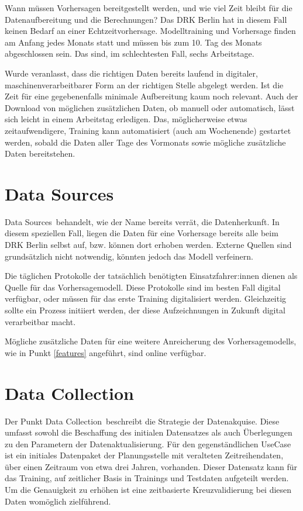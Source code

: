 Wann müssen Vorhersagen bereitgestellt werden, und wie viel Zeit bleibt für die Datenaufbereitung und die Berechnungen? Das DRK Berlin hat in diesem Fall keinen Bedarf an einer Echtzeitvorhersage. Modelltraining und Vorhersage finden am Anfang jedes Monats statt und müssen bis zum 10. Tag des Monats abgeschlossen sein. Das sind, im schlechtesten Fall, sechs Arbeitstage.

Wurde veranlasst, dass die richtigen Daten bereits laufend in digitaler, maschinenverarbeitbarer Form an der richtigen Stelle abgelegt werden. Ist die Zeit für eine gegebenenfalls minimale Aufbereitung kaum noch relevant. Auch der Download von möglichen zusätzlichen Daten, ob manuell oder automatisch, lässt sich leicht in einem Arbeitstag erledigen. Das, möglicherweise etwas zeitaufwendigere, Training kann automatisiert (auch am Wochenende) gestartet werden, sobald die Daten aller Tage des Vormonats sowie mögliche zusätzliche Daten bereitstehen. 



\section{Data Sources}

\glqq Data Sources\grqq\ behandelt, wie der Name bereits verrät, die Datenherkunft. In diesem speziellen Fall, liegen die Daten für eine Vorhersage bereits alle beim DRK Berlin selbst auf, bzw. können dort erhoben werden. Externe Quellen sind grundsätzlich nicht notwendig, könnten jedoch das Modell verfeinern.

Die täglichen Protokolle der tatsächlich benötigten Einsatzfahrer:innen dienen als Quelle für das Vorhersagemodell. Diese Protokolle sind im besten Fall digital verfügbar, oder müssen für das erste Training digitalisiert werden. Gleichzeitig sollte ein Prozess initiiert werden, der diese Aufzeichnungen in Zukunft digital verarbeitbar macht.

Mögliche zusätzliche Daten für eine weitere Anreicherung des Vorhersagemodells, wie in Punkt \ref{features} angeführt, sind online verfügbar. 


\section{Data Collection}

Der Punkt \glqq Data Collection\grqq\ beschreibt die Strategie der Datenakquise. Diese umfasst sowohl die Beschaffung des initialen Datensatzes als auch Überlegungen zu den Parametern der Datenaktualisierung. Für den gegenständlichen UseCase ist ein initiales Datenpaket der Planungsstelle mit veralteten Zeitreihendaten, über einen Zeitraum von etwa drei Jahren, vorhanden. Dieser Datensatz kann für das Training, auf zeitlicher Basis in Trainings und Testdaten aufgeteilt werden. Um die Genauigkeit zu erhöhen ist eine zeitbasierte Kreuzvalidierung bei diesen Daten womöglich zielführend.

